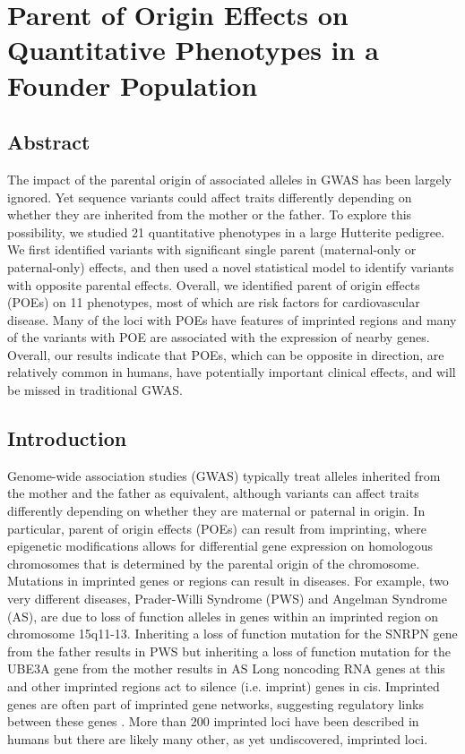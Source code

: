 \chapter{Parent of Origin Effects on Quantitative Phenotypes in a Founder Population}\label{ch:pogwas}
\section[Abstract]{Abstract\footnotemark}


The impact of the parental origin of associated alleles in GWAS has been largely ignored. Yet sequence variants could affect traits differently depending on whether they are inherited from the mother or the father. To explore this possibility, we studied 21 quantitative phenotypes in a large Hutterite pedigree. We first identified variants with significant single parent (maternal-only or paternal-only) effects, and then used a novel statistical model to identify variants with opposite parental effects. Overall, we identified parent of origin effects (POEs) on 11 phenotypes, most of which are risk factors for cardiovascular disease. Many of the loci with POEs have features of imprinted regions and many of the variants with POE are associated with the expression of nearby genes. Overall, our results indicate that POEs, which can be opposite in direction, are relatively common in humans, have potentially important clinical effects, and will be missed in traditional GWAS. 



\section{Introduction}\label{ch02-introduction}
Genome-wide association studies (GWAS) typically treat alleles inherited from the mother and the father as equivalent, although variants can affect traits differently depending on whether they are maternal or paternal in origin. In particular, parent of origin effects (POEs) can result from imprinting, where epigenetic modifications allows for differential gene expression on homologous chromosomes that is determined by the parental origin of the chromosome. Mutations in imprinted genes or regions can result in diseases. For example, two very different diseases, Prader-Willi Syndrome (PWS) and Angelman Syndrome (AS), are due to loss of function alleles in genes within an imprinted region on chromosome 15q11-13. Inheriting a loss of function mutation for the SNRPN gene from the father results in PWS but inheriting a loss of function mutation for the UBE3A gene from the mother results in AS\citep{Peters2014,Falls1999} Long noncoding RNA genes at this and other imprinted regions act to silence (i.e. imprint) genes in cis. Imprinted genes are often part of imprinted gene networks, suggesting regulatory links between these genes \cite{Patten:2016cb,Gabory:2009be,Varrault:2006kn}. More than 200 imprinted loci have been described in humans \cite{Benonisdottir:2016dz} but there are likely many other, as yet undiscovered, imprinted loci. 

